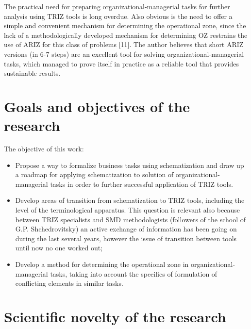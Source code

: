 \documentclass[11pt,a4paper]{book}
\begin{document}
The practical need for preparing organizational-managerial tasks for further
analysis using TRIZ tools is long overdue. Also obvious is the need to offer a
simple and convenient mechanism for determining the operational zone, since
the lack of a methodologically developed mechanism for determining OZ
restrains the use of ARIZ for this class of problems [11]. The author believes
that short ARIZ versions (in 6-7 steps) are an excellent tool for solving
organizational-managerial tasks, which managed to prove itself in practice as
a reliable tool that provides sustainable results.

\section{Goals and objectives of the research}
The objective of this work:
\begin{itemize}
\item Propose a way to formalize business tasks using schematization and draw
  up a roadmap for applying schematization to solution of
  organizational-managerial tasks in order to further successful application
  of TRIZ tools.
\item Develop areas of transition from schematization to TRIZ tools, including
  the level of the terminological apparatus. This question is relevant also
  because between TRIZ specialists and SMD methodologists (followers of the
  school of G.P. Shchedrovitsky) an active exchange of information has been
  going on during the last several years, however the issue of transition
  between tools until now no one worked out;
\item Develop a method for determining the operational zone in
  organizational-managerial tasks, taking into account the specifics of
  formulation of conflicting elements in similar tasks.
\end{itemize}

\section{Scientific novelty of the research}
\end{document}
